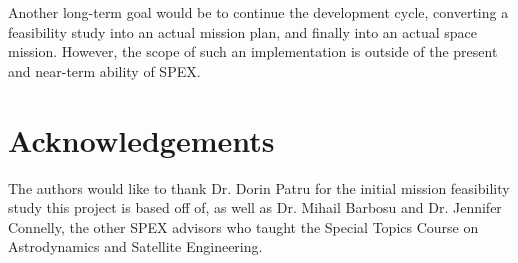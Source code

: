 \documentclass[conference]{IEEEtran} %
\begin{document}
Another long-term goal would be to continue the development cycle, converting a feasibility study into an actual mission plan, and finally into an actual space mission.
However, the scope of such an implementation is outside of the present and near-term ability of SPEX.
\section*{Acknowledgements}
The authors would like to thank Dr. Dorin Patru for the initial mission feasibility study this project is based off of, as well as Dr. Mihail Barbosu and Dr. Jennifer Connelly, the other SPEX advisors who taught the Special Topics Course on Astrodynamics and Satellite Engineering.

\end{document}
